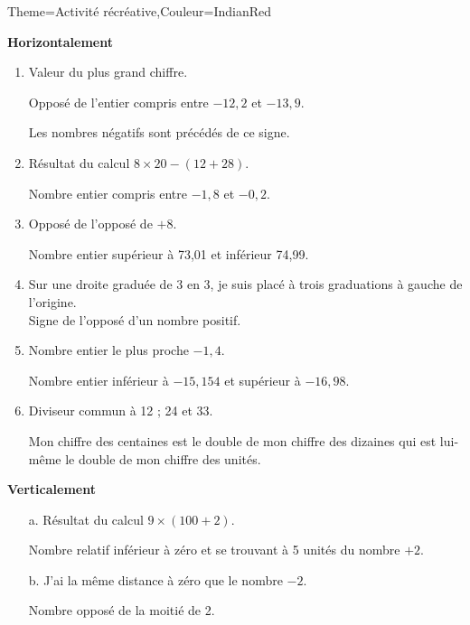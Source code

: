 \begin{Maquette}[Cours]{Theme={Activité récréative},Couleur={IndianRed}}
      \vskip1cm
      \begin{multicols}{2}
      {\bf Horizontalement} \par
      \begin{enumerate}
         \item Valeur du plus grand chiffre. \par
            Opposé de l'entier compris entre $-12,2$ et $-13,9$. \par
            Les nombres négatifs sont précédés de ce signe. \par
         \item Résultat du calcul $8\times20-(12+28)$. \par
            Nombre entier compris entre $-1,8$ et $-0,2$. \par
         \item Opposé de l’opposé de $+8$. \par
            Nombre entier supérieur à 73,01 et inférieur 74,99. \par
         \item Sur une droite graduée de 3 en 3, je suis placé à trois graduations à gauche de l'origine. \\
            Signe de l’opposé d'un nombre positif. \par
         \item Nombre entier le plus proche $-1,4$. \par
            Nombre entier inférieur à $-15,154$ et supérieur à $-16,98$. \par
         \item Diviseur commun à 12 ; 24 et 33. \par
            Mon chiffre des centaines est le double de mon chiffre des dizaines qui est lui-même le double de mon chiffre des unités. \par
         \end{enumerate}
      \columnbreak
      {\bf Verticalement} \par
      \begin{enumerate}
         \item[a.] Résultat du calcul $9\times(100+2)$. \par
            Nombre relatif inférieur à zéro et se trouvant à 5 unités du nombre $+2$. \par
         \item[b.] J'ai la même distance à zéro que le nombre $-2$. \par
            Nombre opposé de la moitié de 2. \par

\end{enumerate}
\end{multicols}
\end{Maquette}
